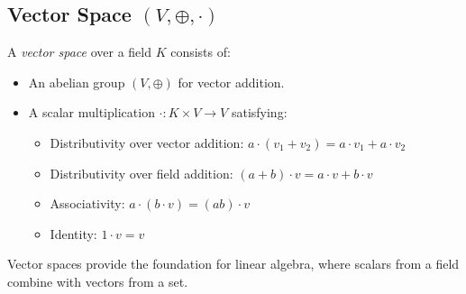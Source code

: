 \subsection{Vector Space \((V, \oplus, \cdot)\)}
A \emph{vector space} over a field \(K\) consists of:
\begin{itemize}[label=\(-\)]
  \item An abelian group \((V, \oplus)\) for vector addition.
  \item A scalar multiplication \(\cdot: K \times V \to V\) satisfying:
  \begin{itemize}
    \item Distributivity over vector addition: \(a \cdot (v_1 + v_2) = a \cdot v_1 + a \cdot v_2\)
    \item Distributivity over field addition: \((a + b) \cdot v = a \cdot v + b \cdot v\)
    \item Associativity: \(a \cdot (b \cdot v) = (ab) \cdot v\)
    \item Identity: \(1 \cdot v = v\)
  \end{itemize}
\end{itemize}
Vector spaces provide the foundation for linear algebra, where scalars from a field combine with vectors from a set.

